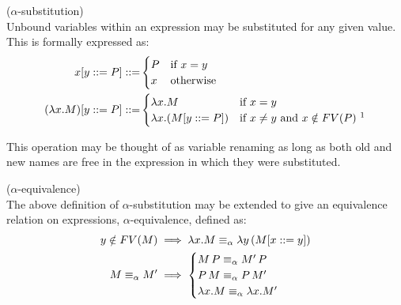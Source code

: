     \begin{definition}{($\alpha$-substitution)\\}
        \label{lambda-alpha-relation}
        Unbound variables within an expression may be substituted for any given value.
        This is formally expressed as:
        \begin{align}
            x[y \defeq P] \defeq &
                \begin{cases}
                    P & \text{if } x = y \\
                    x & \text{otherwise}
                \end{cases} \\
            (\lambda x . M)[y \defeq P] \defeq &
                \begin{cases}
                    \lambda x . M & \text{if } x = y \\
                    \lambda x . (M[y \defeq P]) & \text{if } x \neq y \text{ and } x \notin FV(P)~\footnotemark
                \end{cases}
        \end{align}
    \end{definition}
    This operation may be thought of as variable renaming as long as both old and new names are free in the expression in which they were substituted.

    \begin{corollary*}{($\alpha$-equivalence)\\}
        The above definition of $\alpha$-substitution may be extended to give an equivalence relation on expressions, $\alpha$-equivalence, defined as:
        \begin{align}
            y \notin FV(M) & \implies \lambda x . M \equiv_\alpha \lambda y \, (M[x ::= y]) \\
            M \equiv_\alpha M' & \implies
                \begin{cases}
                    M \, P \equiv_\alpha M' \, P \\
                    P \, M \equiv_\alpha P \, M' \\
                    \lambda x . M \equiv_\alpha \lambda x. M'
                \end{cases}
        \end{align}
    \end{corollary*}


